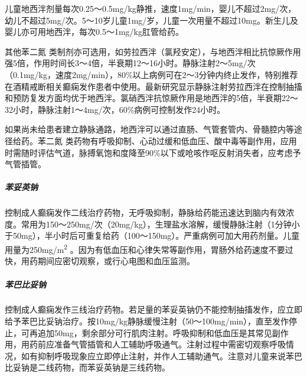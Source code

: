 儿童地西泮剂量每次0.25～0.5mg/kg静推，速度1mg/min，婴儿不超过2mg/次，幼儿不超过5mg/次。5～10岁儿童1mg/岁，儿童一次用量不超过10mg。新生儿及婴儿亦可用地西泮，每次0.5～1mg/kg肛管给药。

其他苯二氮{}
类制剂亦可选用，如劳拉西泮（氯羟安定），与地西泮相比抗惊厥作用强5倍，作用时间长3～4倍，半衰期12～16小时。静脉注射2～5mg/次（0.1mg/kg，速度2mg/min），80\%以上病例可在2～3分钟内终止发作，特别推荐在酒精戒断相关癫痫发作患者中使用。最新研究显示静脉注射劳拉西泮在控制抽搐和预防复发方面均优于地西泮。氯硝西泮抗惊厥作用是地西泮的5倍，半衰期22～32小时，静脉注射1～4mg/次，60\%病例可控制发作24小时。

如果尚未给患者建立静脉通路，地西泮可以通过直肠、气管套管内、骨髓腔内等途径给药。苯二氮{}
类药物有呼吸抑制、心动过缓和低血压、酸中毒等副作用，应用时需随时评估气道，脉搏氧饱和度降至90\%以下或呛咳作呕反射消失者，应考虑予气管插管。

\subparagraph{苯妥英钠}

控制成人癫痫发作二线治疗药物，无呼吸抑制，静脉给药能迅速达到脑内有效浓度。常用为150～250mg/次（20mg/kg），生理盐水溶解，缓慢静脉注射（1分钟小于50mg），半小时后可重复给药（100～150mg）。严重病例可加大用药剂量。儿童用量为250mg/m\textsuperscript{2}
。因为有低血压和心律失常等副作用，胃肠外给药速度不要过快，用药期间应密切观察，或行心电图和血压监测。

\subparagraph{苯巴比妥钠}

控制成人癫痫发作三线治疗药物。若足量的苯妥英钠仍不能控制抽搐发作，应立即给予苯巴比妥钠治疗。按10mg/kg静脉缓慢注射（50～100mg/min），直至发作停止，可再追加50mg，剩余部分可行肌肉注射。呼吸抑制和低血压是其常见副作用，用药前应准备气管插管和人工辅助呼吸通气。注射过程中需密切观察呼吸情况，如有抑制呼吸现象应立即停止注射，并作人工辅助通气。注意对儿童来说苯巴比妥钠是二线药物，而苯妥英钠是三线药物。


